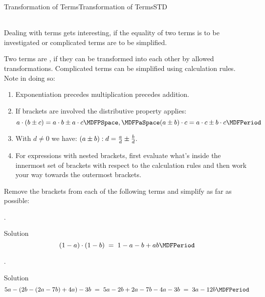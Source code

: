 \begin{MXContent}{Transformation of Terms}{Transformation of Terms}{STD}

\ \\
Dealing with terms gets interesting, if the equality of two terms is to be investigated or complicated terms are to
be simplified.

\begin{MInfo}
Two terms are , if they can be transformed into each other by allowed transformations. 
Complicated terms can be simplified using calculation rules. Note in doing so:
\begin{enumerate}
\item Exponentiation precedes multiplication precedes addition.
\item If brackets are involved the distributive property applies:
$$a\cdot(b\pm c) = a\cdot b\pm a\cdot c \MDFPSpace, \MDFPaSpace (a\pm b)\cdot c = a\cdot c \pm b\cdot c \MDFPeriod$$
\item With $d\neq 0$ we have: $\displaystyle (a\pm b):d = \tfrac{a}{d}\pm \tfrac{b}{d}.$
\item For expressions with nested brackets, first evaluate what's inside the innermost
  set of brackets with respect to the calculation rules and then work your way towards the outermost brackets.
\end{enumerate}
\end{MInfo}

\begin{MExercise}
Remove the brackets from each of the following terms and simplify as far as possible:
\begin{MExerciseItems}
\item{. \begin{MHint}{Solution}$$(1-a)\cdot(1-b)\;=\; 1-a-b+a b \MDFPeriod $$\end{MHint}}
\item{. \begin{MHint}{Solution}$$5a-(2b-(2a-7b)+4a)-3b \; = \; 5a-2b+2a-7b-4a-3b \;=\; 3a-12b \MDFPeriod  $$\end{MHint}}
\end{MExerciseItems}
\end{MExercise}


\end{MXContent}
